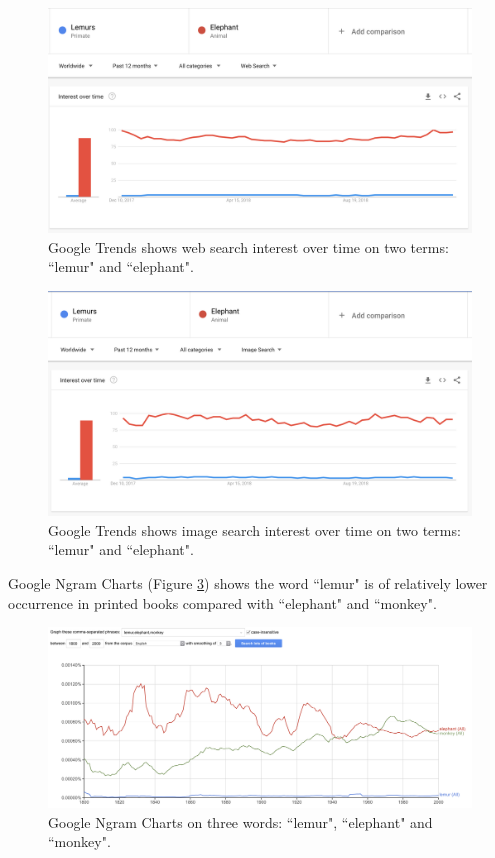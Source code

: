 \documentclass{article}
\begin{document}
\begin{figure}[h]
  \includegraphics[width=\linewidth]{img/google-trend-web-search.png}
  \caption{Google Trends shows web search interest over time on two terms: ``lemur" and ``elephant".}
  \label{fig:google-trend-web-search}
\end{figure}

\begin{figure}[h]
  \includegraphics[width=\linewidth]{img/google-trend-image-search.png}
  \caption{Google Trends shows image search interest over time on two terms: ``lemur" and ``elephant".}
  \label{fig:google-trend-image-search}
\end{figure}

Google Ngram Charts (Figure \ref{fig:google-ngram}) shows the word ``lemur" is of relatively lower occurrence in printed books compared with ``elephant" and ``monkey".

\begin{figure}[h]
  \includegraphics[width=\linewidth]{img/google-ngram.png}
  \caption{Google Ngram Charts on three words: ``lemur", ``elephant" and ``monkey".}
  \label{fig:google-ngram}
\end{figure}
\end{document}
